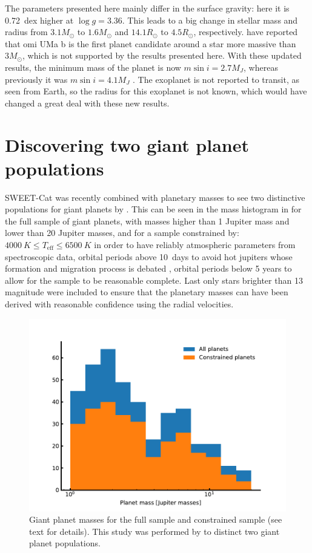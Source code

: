 The parameters presented here mainly differ in the surface gravity: here it is \SI{0.72}{dex} higher
at $\log g=3.36$. This leads to a big change in stellar mass and radius from $3.1M_\odot$ to
$1.6M_\odot$ and $14.1R_\odot$ to $4.5R_\odot$, respectively. \citet{Sato2012} have reported that
omi UMa b is the first planet candidate around a star more massive than $3M_\odot$, which is not
supported by the results presented here. With these updated results, the minimum mass of the planet
is now $m\sin i=2.7M_J$, whereas previously it was $m\sin i=4.1M_J$ \citep{Sato2012}. The exoplanet
is not reported to transit, as seen from Earth, so the radius for this exoplanet is not known, which
would have changed a great deal with these new results.




\section{Discovering two giant planet populations}


SWEET-Cat was recently combined with planetary masses to see two distinctive populations for giant
planets by \citet{Santos2017}. This can be seen in the mass histogram in 
for the full sample of giant planets, with masses higher than 1 Jupiter mass and lower than 20
Jupiter masses, and for a sample constrained by: $\SI{4000}{K}\leq T_\mathrm{eff} \leq\SI{6500}{K}$
in order to have reliably atmospheric parameters from spectroscopic data, orbital periods above
\SI{10}{days} to avoid hot jupiters whose formation and migration process is debated \citep[see
e.g.]{Ngo2016}, orbital periods below 5 years to allow for the sample to be reasonable complete.
Last only stars brighter than 13 magnitude were included to ensure that the planetary masses can
have been derived with reasonable confidence using the radial velocities.

\begin{figure}[htpb!]
    \centering
    \includegraphics[width=1.0\linewidth]{figures/giantPopulation.pdf}
    \caption{Giant planet masses for the full sample and constrained sample (see text for details).
             This study was performed by \citet{Santos2017} to distinct two giant planet populations.}
    \label{fig:giantpopulations}
\end{figure}

